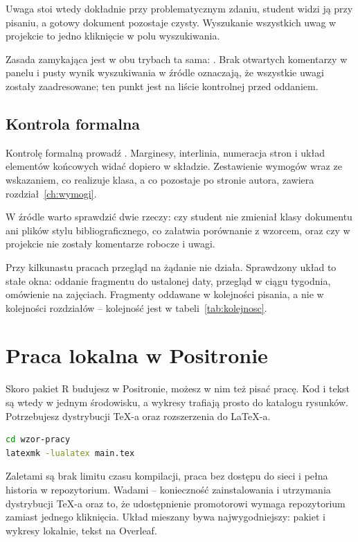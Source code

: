 Uwaga stoi wtedy dokładnie przy problematycznym zdaniu, student widzi ją przy pisaniu, a gotowy dokument pozostaje czysty. Wyszukanie wszystkich uwag w projekcie to jedno kliknięcie w polu wyszukiwania.

Zasada zamykająca jest w obu trybach ta sama: . Brak otwartych komentarzy w panelu i pusty wynik wyszukiwania w źródle oznaczają, że wszystkie uwagi zostały zaadresowane; ten punkt jest na liście kontrolnej przed oddaniem.

\subsection{Kontrola formalna}

Kontrolę formalną prowadź . Marginesy, interlinia, numeracja stron i układ elementów końcowych widać dopiero w składzie. Zestawienie wymogów wraz ze wskazaniem, co realizuje klasa, a co pozostaje po stronie autora, zawiera rozdział~\ref{ch:wymogi}.

W źródle warto sprawdzić dwie rzeczy: czy student nie zmieniał klasy dokumentu ani plików stylu bibliograficznego, co załatwia porównanie z wzorcem, oraz czy w projekcie nie zostały komentarze robocze i uwagi.

Przy kilkunastu pracach przegląd na żądanie nie działa. Sprawdzony układ to stałe okna: oddanie fragmentu do ustalonej daty, przegląd w ciągu tygodnia, omówienie na zajęciach. Fragmenty oddawane w kolejności pisania, a nie w kolejności rozdziałów -- kolejność jest w tabeli~\ref{tab:kolejnosc}.

\section{Praca lokalna w Positronie}\label{sec:lokalnie}

Skoro pakiet R budujesz w Positronie, możesz w nim też pisać pracę. Kod i tekst są wtedy w jednym środowisku, a wykresy trafiają prosto do katalogu rysunków. Potrzebujesz dystrybucji TeX-a oraz rozszerzenia do LaTeX-a.

\begin{lstlisting}[language=bash,numbers=none]
cd wzor-pracy
latexmk -lualatex main.tex
\end{lstlisting}

Zaletami są brak limitu czasu kompilacji, praca bez dostępu do sieci i pełna historia w repozytorium. Wadami -- konieczność zainstalowania i utrzymania dystrybucji TeX-a oraz to, że udostępnienie promotorowi wymaga repozytorium zamiast jednego kliknięcia. Układ mieszany bywa najwygodniejszy: pakiet i wykresy lokalnie, tekst na Overleaf.

